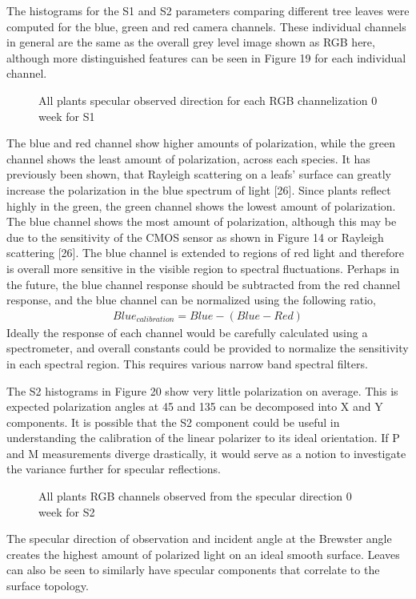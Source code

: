 The histograms for the S1 and S2 parameters comparing different tree leaves were computed for the blue, green and red camera channels.  These individual channels in general are the same as the overall grey level image shown as RGB here, although more distinguished features can be seen in Figure 19 for each individual channel.
%
\begin{figure}[!htb]
    \begin{center}
    \end{center}
    \caption{All plants specular observed direction for each RGB channelization 0 week for S1}
    \label{fig:polarization}
\end{figure}
%
The blue and red channel show higher amounts of polarization, while the green channel shows the least amount of polarization, across each species.  It has previously been shown, that Rayleigh scattering on a leafs' surface can greatly increase the polarization in the blue spectrum of light [26].  Since plants reflect highly in the green, the green channel shows the lowest amount of polarization.  The blue channel shows the most amount of polarization, although this may be due to the sensitivity of the CMOS sensor as shown in Figure 14 or Rayleigh scattering [26].  The blue channel is extended to regions of red light and therefore is overall more sensitive in the visible region to spectral fluctuations.  Perhaps in the future, the blue channel response should be subtracted from the red channel response, and the blue channel can be normalized using the following ratio,
%
\begin{align}
    Blue_{calibration} = Blue - (Blue - Red)
\end{align}
%
Ideally the response of each channel would be carefully calculated using a spectrometer, and overall constants could be provided to normalize the sensitivity in each spectral region.  This requires various narrow band spectral filters.

The S2 histograms in Figure 20 show very little polarization on average.  This is expected polarization angles at 45 and 135 can be decomposed into X and Y components.  It is possible that the S2 component could be useful in understanding the calibration of the linear polarizer to its ideal orientation.  If P and M measurements diverge drastically, it would serve as a notion to investigate the variance further for specular reflections.
%
\begin{figure}[!htb]
    \begin{center}
    \end{center}
    \caption{All plants RGB channels observed from the specular direction 0 week for S2}
    \label{fig:polarization}
\end{figure}
%
The specular direction of observation and incident angle at the Brewster angle creates the highest amount of polarized light on an ideal smooth surface.  Leaves can also be seen to similarly have specular components that correlate to the surface topology.

